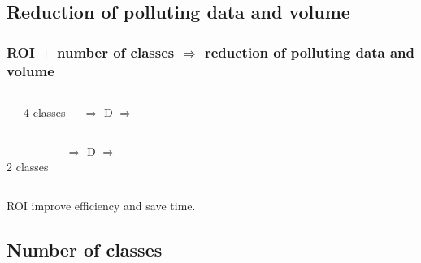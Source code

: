	\subsection[Polluted data]{Reduction of polluting data and volume}
		\begin{frame}
		\frametitle{ROI + number of classes $\Rightarrow$ reduction of polluting data and volume}

		\begin{columns}[c]	
		\column{9em}
			\\
			\begin{center}
				4 classes
			\end{center}				
			\column{0.1em}
			$\Rightarrow$
			\column{12em}
			\vspace{1em}
			\column{0.1em}
			D
			$\Rightarrow$
			\column{9em}
		\end{columns}\vspace{1em}
		\pause
		\begin{columns}[c]	
		\column{9em}
			\begin{center}		
				\\
				2 classes
			\end{center}				
			\column{0.1em}
			$\Rightarrow$
			\column{12em}
			\column{0.1em}
			D
			$\Rightarrow$
			\column{9em}
			\begin{center}					
			\end{center}			
		\end{columns}
		\begin{center}
			\alert{ROI improve efficiency and save time.}
		\end{center}

	\end{frame}
	

	\subsection[Number of classes]{Number of classes}

